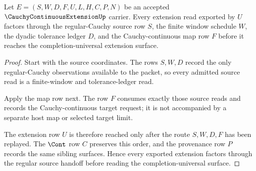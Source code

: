 \begin{theorem}
\label{thm:cauchy-continuous-extension-regular-source-handoff}
Let $E=(S,W,D,F,U,L,H,C,P,N)$ be an accepted $\CauchyContinuousExtensionUp$ carrier. Every extension read exported by $U$ factors through the regular-Cauchy source row $S$, the finite window schedule $W$, the dyadic tolerance ledger $D$, and the Cauchy-continuous map row $F$ before it reaches the completion-universal extension surface.
\end{theorem}
\begin{proof}
Start with the source coordinates. The rows $S,W,D$ record the only regular-Cauchy observations available to the packet, so every admitted source read is a finite-window and tolerance-ledger read.

Apply the map row next. The row $F$ consumes exactly those source reads and records the Cauchy-continuous target request; it is not accompanied by a separate host map or selected target limit.

The extension row $U$ is therefore reached only after the route $S,W,D,F$ has been replayed. The $\Cont$ row $C$ preserves this order, and the provenance row $P$ records the same sibling surfaces. Hence every exported extension factors through the regular source handoff before reading the completion-universal surface.
\end{proof}

